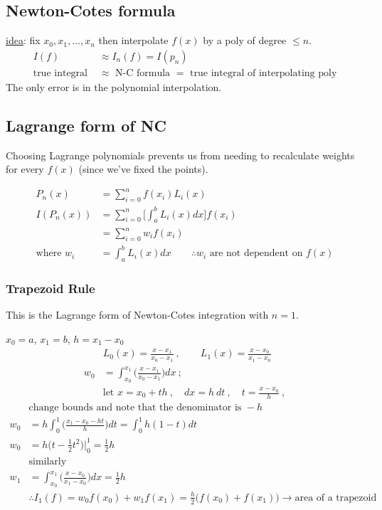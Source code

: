 \documentclass[12pt]{article}
\begin{document}
 
\subsection*{Newton-Cotes formula}
 
\underline{idea}: fix $x_0, x_1, \dots, x_n$ then interpolate $f(x)$ by a poly of degree $\leq n$.
%
\begin{align*}
I(f) &\approx I_n(f) = I(p_n)\\
\text{true integral } &\approx \text{ N-C formula } = \text{ true integral of interpolating poly}
\end{align*}
%
The only error is in the polynomial interpolation.

\subsection*{Lagrange form of NC}
Choosing Lagrange polynomials prevents us from needing to recalculate weights for every $f(x)$ (since we've fixed the points).

\begin{align*}
P_n(x) &= \sum_{i=0}^{n}f(x_i)L_i(x) \\
%
I(P_n(x)) &= \sum_{i=0}^{n} \bigl[ \int_a^b L_i(x)dx \bigr] f(x_i) \\
%
&= \sum_{i=0}^{n} w_i f(x_i)\\
\text{where } w_i &=  \int_a^b L_i(x)dx \qquad \therefore w_i \text{ are not dependent on } f(x)
\end{align*}

\subsubsection*{Trapezoid Rule}
This is the Lagrange form of Newton-Cotes integration with $n=1$.

$x_0 = a$, $x_1 = b$, $h = x_1 - x_0$
%
\begin{align*}
&L_0(x) = \frac{x-x_1}{x_0-x_1}\:, \qquad L_1(x) = \frac{x-x_0}{x_1-x_0} \\
%
w_0 &= \int_{x_0}^{x_1} \bigl(\frac{x-x_1}{x_0-x_1}\bigr) dx\:; 
\\ &\text{let } x = x_0 + th  \:, \quad dx = h\:dt\:, \quad t = \frac{x-x_0}{h}\:,
\end{align*}
\begin{align*}
&\text{change bounds and note that the denominator is }-h \\
%
w_0 &= h \int_0^1 \bigl(\frac{x_1 - x_0 - ht}{h}\bigr)dt = \int_0^1 h(1-t)dt \\
%
w_0 &= h\bigl(t - \frac{1}{2}t^2 \bigr) |_0^1 = \frac{1}{2}h\\
%
&\text{similarly}\\
%
w_1 &= \int_{x_0}^{x_1} \bigl(\frac{x-x_0}{x_1-x_0}\bigr) dx = \frac{1}{2}h\\
%
& \therefore I_1(f) = w_0f(x_0) + w_1f(x_1) = \boxed{\frac{h}{2}\bigl(f(x_0) + f(x_1)\bigr)} \rightarrow \text{area of a trapezoid}
\end{align*}
\end{document}
